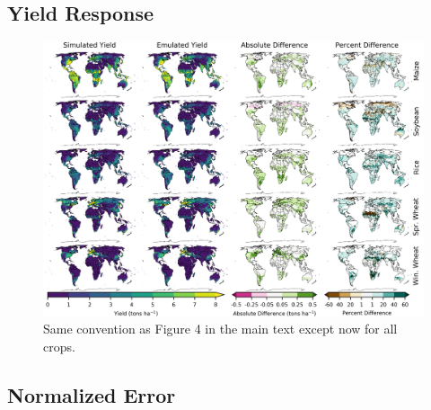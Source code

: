 \documentclass[10pt]{article}
\begin{document}
\clearpage
\subsection{Yield Response}
\begin{figure}[h!]
\includegraphics[width=\textwidth]{lpjml_grid.png}
\caption{Same convention as Figure 4 in the main text except now for all crops.}
\label{fig:lpjmlrice}
\end{figure}

\clearpage
\subsection{Normalized Error}
\end{document}
